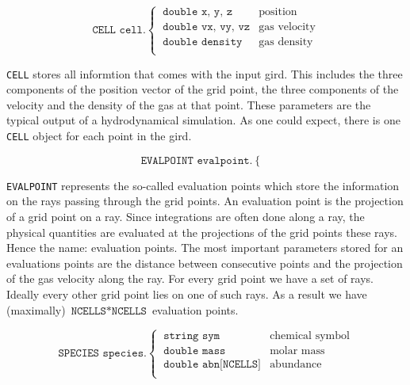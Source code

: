 \documentclass[]{article}
\begin{document}
\begin{equation}
\texttt{CELL cell.}
\begin{cases}
\ \texttt{double x, y, z} & \text{position}\\
\ \texttt{double vx, vy, vz} &  \text{gas velocity} \\
\ \texttt{double density} &  \text{gas density} \\
\end{cases}
\end{equation}

\texttt{CELL} stores all informtion that comes with the input gird. This includes the three components of the position vector of the grid point, the three components of the velocity and the density of the gas at that point. These parameters are the typical output of a hydrodynamical simulation. As one could expect, there is one \texttt{CELL} object for each point in the gird.

\begin{equation}
\texttt{EVALPOINT evalpoint.}
\begin{cases}

\end{cases}
\end{equation}

\texttt{EVALPOINT} represents the so-called evaluation points which store the information on the rays passing through the grid points.  An evaluation point is the projection of a grid point on a ray. Since integrations are often done along a ray, the physical quantities are evaluated at the projections of the grid points these rays. Hence the name: evaluation points. The most important parameters stored for an evaluations points are the distance between consecutive points and the projection of the gas velocity along the ray. For every grid point we have a set of rays. Ideally every other grid point lies on one of such rays. As a result we have (maximally) $\texttt{NCELLS}*\texttt{NCELLS}$ evaluation points.

\begin{equation}
\texttt{SPECIES species.}
\begin{cases}
\ \texttt{string sym} & \text{chemical symbol}\\
\ \texttt{double mass} & \text{molar mass} \\
\ \texttt{double abn[NCELLS]} &  \text{abundance} \\
\end{cases}
\end{equation}
\end{document}
